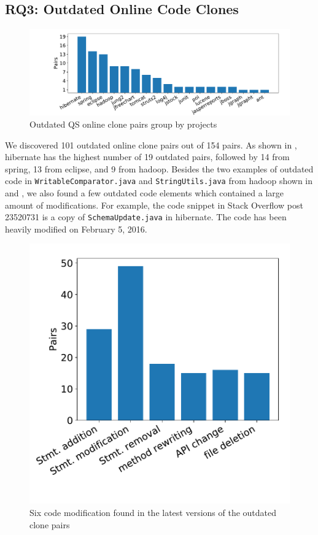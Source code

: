 \documentclass[10pt,journal,compsoc]{IEEEtran}
\begin{document}
\subsection{RQ3: Outdated Online Code Clones}

\begin{figure}
	\centering
	\includegraphics[width=0.8\linewidth]{outdated}
	\caption{Outdated QS online clone pairs group by projects}
	\label{fig:outdated}
\end{figure}

We discovered 101 outdated online clone pairs out of 154 pairs. As shown in
, \textsf{hibernate} has the highest number of 19 outdated
pairs, followed by 14 from \textsf{spring}, 13 from \textsf{eclipse}, and 9 from
\textsf{hadoop}. Besides the two examples of outdated code in %
{\small{\texttt{WritableComparator.java}}} and
{\small{\texttt{StringUtils.java}}} from \textsf{hadoop} shown in
 and , we also found a few
outdated code elements which contained a large amount of modifications. For
example, the code snippet in Stack Overflow post 23520731 is a copy of
{\small{\texttt{SchemaUpdate.java}}} in \textsf{hibernate}. The code has been
heavily modified on February 5, 2016.

\begin{figure}
	\centering
	\includegraphics[width=0.7\linewidth]{mod_types}
	\caption{Six code modification found in the latest versions of the outdated clone pairs}
	\label{fig:mod_types}
\end{figure}
\end{document}
